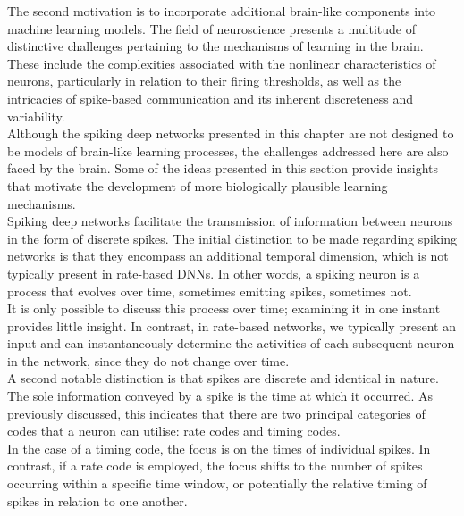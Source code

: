 \noindent The second motivation is to incorporate additional brain-like components into machine learning models. The field of neuroscience presents a multitude of distinctive challenges pertaining to the mechanisms of learning in the brain. These include the complexities associated with the nonlinear characteristics of neurons, particularly in relation to their firing thresholds, as well as the intricacies of spike-based communication and its inherent discreteness and variability. \\

\noindent Although the spiking deep networks presented in this chapter are not designed to be models of brain-like learning processes, the challenges addressed here are also faced by the brain. Some of the ideas presented in this section provide insights that motivate the development of more biologically plausible learning mechanisms.\\

\noindent Spiking deep networks facilitate the transmission of information between neurons in the form of discrete spikes. The initial distinction to be made regarding spiking networks is that they encompass an additional temporal dimension, which is not typically present in rate-based DNNs. In other words, a spiking neuron is a process that evolves over time, sometimes emitting spikes, sometimes not.\\

\noindent It is only possible to discuss this process over time; examining it in one instant provides little insight. In contrast, in rate-based networks, we typically present an input and can instantaneously determine the activities of each subsequent neuron in the network, since they do not change over time. \\

\noindent A second notable distinction is that spikes are discrete and identical in nature. The sole information conveyed by a spike is the time at which it occurred. As previously discussed, this indicates that there are two principal categories of codes that a neuron can utilise: rate codes and timing codes. \\

\noindent In the case of a timing code, the focus is on the times of individual spikes. In contrast, if a rate code is employed, the focus shifts to the number of spikes occurring within a specific time window, or potentially the relative timing of spikes in relation to one another. \\

